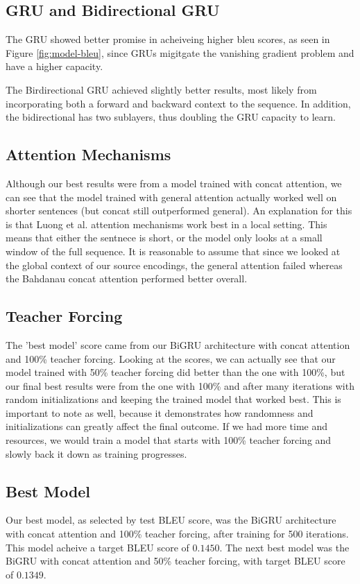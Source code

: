 \documentclass[twoside,twocolumn]{article}
\begin{document}
\subsection{GRU and Bidirectional GRU}
The GRU showed better promise in acheiveing higher bleu scores, as seen in
Figure \ref{fig:model-bleu}, since GRUs migitgate the vanishing gradient
problem and have a higher capacity.

The Birdirectional GRU achieved slightly better results, most likely from
incorporating both a forward and backward context to the sequence. In addition,
the bidirectional has two sublayers, thus doubling the GRU capacity to learn.

\subsection{Attention Mechanisms}
Although our best results were from a model trained with concat attention, we
can see that the model trained with general attention actually worked well on
shorter sentences (but concat still outperformed general).
An explanation for this is that Luong et al.
\cite{luong2015effective} attention mechanisms work best in a local setting.
This means that either the sentnece is short, or the model only looks at a
small window of the full sequence. It is reasonable to assume that since we
looked at the global context of our source encodings, the general attention
failed whereas the Bahdanau \cite{bahdanau2014neural} concat attention
performed better overall.

\subsection{Teacher Forcing}
The 'best model' score came from our BiGRU architecture with concat attention
and 100\% teacher forcing. Looking at the scores, we can actually see that our
model trained with 50\% teacher forcing did better than the one with 100\%, but
our final best results were from the one with 100\% and after many iterations
with random initializations and keeping the trained model that worked best.
This is important to note as well, because it demonstrates how randomness and
initializations can greatly affect the final outcome. If we had more time and
resources, we would train a model that starts with 100\% teacher forcing and
slowly back it down as training progresses.

\subsection{Best Model}
Our best model, as selected by test BLEU score, was the BiGRU architecture
with concat attention and 100\% teacher forcing, after training for 500
iterations. This model acheive a target BLEU score of $0.1450$. The next best
model was the BiGRU with concat attention and 50\% teacher forcing, with target
BLEU score of $0.1349$.
\end{document}
